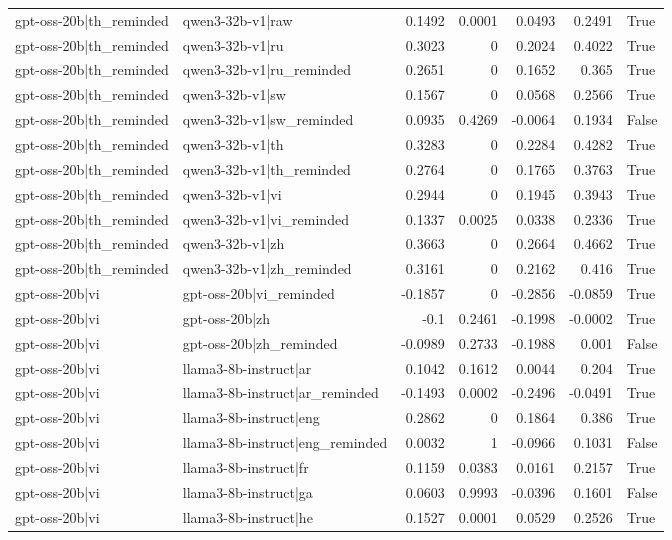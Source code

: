 \begin{table}
\begin{tabular}{l l r r r r l}
gpt-oss-20b|th_reminded & qwen3-32b-v1|raw & 0.1492 & 0.0001 & 0.0493 & 0.2491 & True \\
gpt-oss-20b|th_reminded & qwen3-32b-v1|ru & 0.3023 & 0 & 0.2024 & 0.4022 & True \\
gpt-oss-20b|th_reminded & qwen3-32b-v1|ru_reminded & 0.2651 & 0 & 0.1652 & 0.365 & True \\
gpt-oss-20b|th_reminded & qwen3-32b-v1|sw & 0.1567 & 0 & 0.0568 & 0.2566 & True \\
gpt-oss-20b|th_reminded & qwen3-32b-v1|sw_reminded & 0.0935 & 0.4269 & -0.0064 & 0.1934 & False \\
gpt-oss-20b|th_reminded & qwen3-32b-v1|th & 0.3283 & 0 & 0.2284 & 0.4282 & True \\
gpt-oss-20b|th_reminded & qwen3-32b-v1|th_reminded & 0.2764 & 0 & 0.1765 & 0.3763 & True \\
gpt-oss-20b|th_reminded & qwen3-32b-v1|vi & 0.2944 & 0 & 0.1945 & 0.3943 & True \\
gpt-oss-20b|th_reminded & qwen3-32b-v1|vi_reminded & 0.1337 & 0.0025 & 0.0338 & 0.2336 & True \\
gpt-oss-20b|th_reminded & qwen3-32b-v1|zh & 0.3663 & 0 & 0.2664 & 0.4662 & True \\
gpt-oss-20b|th_reminded & qwen3-32b-v1|zh_reminded & 0.3161 & 0 & 0.2162 & 0.416 & True \\
gpt-oss-20b|vi & gpt-oss-20b|vi_reminded & -0.1857 & 0 & -0.2856 & -0.0859 & True \\
gpt-oss-20b|vi & gpt-oss-20b|zh & -0.1 & 0.2461 & -0.1998 & -0.0002 & True \\
gpt-oss-20b|vi & gpt-oss-20b|zh_reminded & -0.0989 & 0.2733 & -0.1988 & 0.001 & False \\
gpt-oss-20b|vi & llama3-8b-instruct|ar & 0.1042 & 0.1612 & 0.0044 & 0.204 & True \\
gpt-oss-20b|vi & llama3-8b-instruct|ar_reminded & -0.1493 & 0.0002 & -0.2496 & -0.0491 & True \\
gpt-oss-20b|vi & llama3-8b-instruct|eng & 0.2862 & 0 & 0.1864 & 0.386 & True \\
gpt-oss-20b|vi & llama3-8b-instruct|eng_reminded & 0.0032 & 1 & -0.0966 & 0.1031 & False \\
gpt-oss-20b|vi & llama3-8b-instruct|fr & 0.1159 & 0.0383 & 0.0161 & 0.2157 & True \\
gpt-oss-20b|vi & llama3-8b-instruct|ga & 0.0603 & 0.9993 & -0.0396 & 0.1601 & False \\
gpt-oss-20b|vi & llama3-8b-instruct|he & 0.1527 & 0.0001 & 0.0529 & 0.2526 & True \\

\end{tabular}
\end{table}
